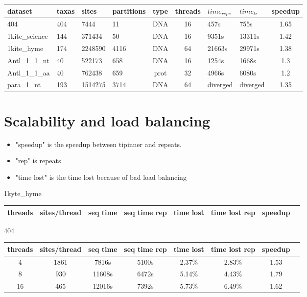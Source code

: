 \documentclass[a4paper]{article}
\begin{document}
\begin{tabular}{|l|l|l|l|c|c|l|l|c|}
\hline dataset                    & taxas & sites    & partitions & type & threads & $time_{reps}$ & $time_{ti}$ & speedup\\
\hline 404                        & 404   &  7444    & 11         & DNA  & 16 & 457s     &  755s     & 1.65  \\
\hline 1kite\_science             & 144   &  371434  & 50         & DNA  & 16 & 9351s    &  13311s   & 1.42  \\
\hline 1kite\_hyme                & 174   &  2248590 & 4116       & DNA  & 64 & 21663s   &  29971s   & 1.38 \\
\hline Antl\_1\_1\_nt             & 40    &  522173  & 658        & DNA  & 16 & 1254s    &  1668s    & 1.3  \\
\hline Antl\_1\_1\_aa             & 40    &  762438  & 659        & prot & 32 & 4966s    &  6080s    & 1.2\\
\hline para\_1\_nt                & 193   &  1514275 & 3714       & DNA  & 64 & diverged &  diverged & 1.35  \\
\hline 
\end{tabular}\newline
\newline


\section{Scalability and load balancing}

\begin{itemize}
\item "speedup" is the speedup between tipinner and repeats.
\item "rep" is repeats
\item "time lost" is the time lost because of bad load balancing
\end{itemize}

1kyte\_hyme

\begin{tabular}{|c|c|c|c|c|c|c|c|}
\hline threads & sites/thread & seq time & seq time rep & time lost & time lost rep & speedup \\
\hline
\end{tabular} \newline


404

\begin{tabular}{|c|c|c|c|c|c|c|c|}
\hline threads & sites/thread & seq time & seq time rep & time lost & time lost rep & speedup \\
\hline 4 & 1861 & 7816s & 5100s & 2.37\% & 2.83\% & 1.53 \\
\hline 8 & 930 & 11608s & 6472s & 5.14\% & 4.43\% & 1.79 \\
\hline 16 & 465 & 12016s & 7392s & 5.73\% & 6.49\% & 1.62 \\
\hline
\end{tabular} \newline
\end{document}
